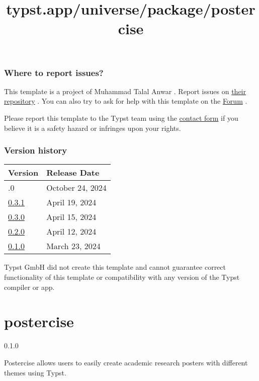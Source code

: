 \subsubsection{Where to report issues?}\label{where-to-report-issues}

This template is a project of Muhammad Talal Anwar . Report issues on
\href{https://github.com/talal/pesha}{their repository} . You can also
try to ask for help with this template on the
\href{https://forum.typst.app}{Forum} .

Please report this template to the Typst team using the
\href{https://typst.app/contact}{contact form} if you believe it is a
safety hazard or infringes upon your rights.

\label{versions}
\subsubsection{Version history}\label{version-history}

\begin{longtable}[]{@{}ll@{}}
\toprule\noalign{}
Version & Release Date \\
\midrule\noalign{}
\endhead
\bottomrule\noalign{}
\endlastfoot
0.4.0 & October 24, 2024 \\
\href{https://typst.app/universe/package/pesha/0.3.1/}{0.3.1} & April
19, 2024 \\
\href{https://typst.app/universe/package/pesha/0.3.0/}{0.3.0} & April
15, 2024 \\
\href{https://typst.app/universe/package/pesha/0.2.0/}{0.2.0} & April
12, 2024 \\
\href{https://typst.app/universe/package/pesha/0.1.0/}{0.1.0} & March
23, 2024 \\
\end{longtable}

Typst GmbH did not create this template and cannot guarantee correct
functionality of this template or compatibility with any version of the
Typst compiler or app.


\title{typst.app/universe/package/postercise}

\label{banner}
\section{postercise}\label{postercise}

{ 0.1.0 }

Postercise allows users to easily create academic research posters with
different themes using Typst.

